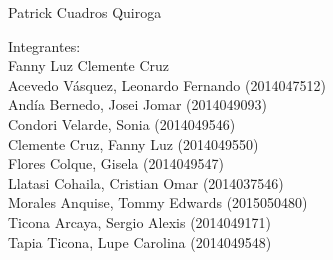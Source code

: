 \documentclass[12pt,letterpaper]{article}
\begin{document}
\begin{titlepage}
\begin{center}
\vspace*{0.1in}
\begin{large}
 Patrick Cuadros Quiroga\\
\end{large}

\vspace*{0.2in}
\vspace*{0.1in}
\begin{large}
\begin{flushleft}
Integrantes: \\
Fanny Luz Clemente Cruz \\
Acevedo Vásquez, Leonardo Fernando 	(2014047512) \\
Andía Bernedo, Josei Jomar 			(2014049093) \\
Condori Velarde, Sonia          	(2014049546) \\
Clemente Cruz, Fanny Luz    		(2014049550) \\
Flores Colque, Gisela           	(2014049547) \\
Llatasi Cohaila, Cristian Omar		(2014037546) \\
Morales Anquise, Tommy Edwards 		(2015050480) \\
Ticona Arcaya, Sergio Alexis		(2014049171) \\
Tapia Ticona, Lupe Carolina			(2014049548) \\
\end{flushleft}


\end{large}
\end{center}

\end{titlepage}




\tableofcontents
\thispagestyle{empty}
\newpage
\setcounter{page}{1}

 
\end{document}
